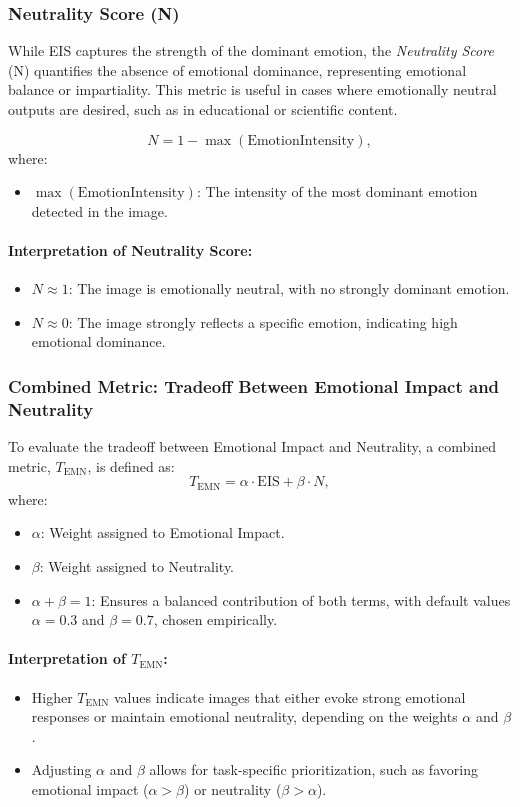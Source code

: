 \subsubsection{Neutrality Score (N)}
While EIS captures the strength of the dominant emotion, the \textit{Neutrality Score} (N) quantifies the absence of emotional dominance, representing emotional balance or impartiality. This metric is useful in cases where emotionally neutral outputs are desired, such as in educational or scientific content.

\[
N = 1 - \max(\text{EmotionIntensity}),
\]
where:
\begin{itemize}
    \item \(\max(\text{EmotionIntensity})\): The intensity of the most dominant emotion detected in the image.
\end{itemize}

\paragraph{Interpretation of Neutrality Score:}
\begin{itemize}
    \item \(N \approx 1\): The image is emotionally neutral, with no strongly dominant emotion.
    \item \(N \approx 0\): The image strongly reflects a specific emotion, indicating high emotional dominance.
\end{itemize}


\subsubsection{Combined Metric: Tradeoff Between Emotional Impact and Neutrality}
To evaluate the tradeoff between Emotional Impact and Neutrality, a combined metric, \(T_{\text{EMN}}\), is defined as:
\[
T_{\text{EMN}} = \alpha \cdot \text{EIS} + \beta \cdot N,
\]
where:
\begin{itemize}
    \item \(\alpha\): Weight assigned to Emotional Impact.
    \item \(\beta\): Weight assigned to Neutrality.
    \item \(\alpha + \beta = 1\): Ensures a balanced contribution of both terms, with default values \(\alpha = 0.3\) and \(\beta = 0.7\), chosen empirically.
\end{itemize}

\paragraph{Interpretation of \(T_{\text{EMN}}\):}
\begin{itemize}
    \item Higher \(T_{\text{EMN}}\) values indicate images that either evoke strong emotional responses or maintain emotional neutrality, depending on the weights \(\alpha\) and \(\beta\).
    \item Adjusting \(\alpha\) and \(\beta\) allows for task-specific prioritization, such as favoring emotional impact (\(\alpha > \beta\)) or neutrality (\(\beta > \alpha\)).
\end{itemize}

